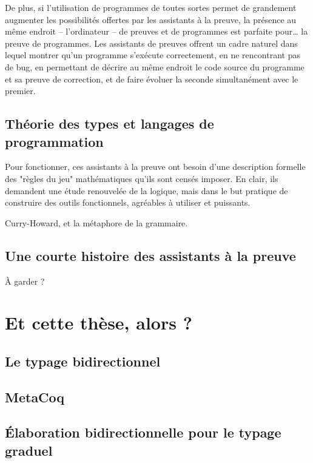 De plus, si l’utilisation de programmes
de toutes sortes permet de grandement augmenter
les possibilités offertes par les assistants à la preuve,
la présence au même endroit – l’ordinateur –
de preuves et de programmes est parfaite pour… la preuve de programmes.
Les assistants de preuves offrent un cadre naturel dans lequel
montrer qu’un programme s’exécute correctement, en ne rencontrant pas de bug,
en permettant de décrire au même endroit le code source du programme et sa
preuve de correction, et de faire évoluer la seconde simultanément avec le premier.

\subsection{Théorie des types et langages de programmation}

Pour fonctionner, ces assistants à la preuve ont besoin d’une
description formelle des "règles du jeu" mathématiques qu’ils sont censés imposer.
En clair, ils demandent une étude renouvelée de la logique, mais dans le but
pratique de construire des outils fonctionnels, agréables à utiliser et puissants.

Curry-Howard, et la métaphore de la grammaire.

\subsection{Une courte histoire des assistants à la preuve}

À garder ?

\section{Et cette thèse, alors ?}
\label{sec:cette-these}

\subsection{Le typage bidirectionnel}

\subsection{MetaCoq}

\subsection{Élaboration bidirectionnelle pour le typage graduel}
